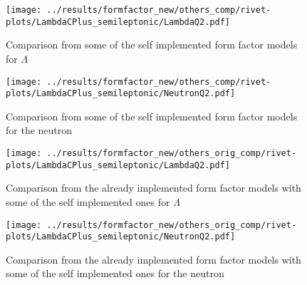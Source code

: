 \begin{figure}[h]
  \centering
  \texttt{[image: ../results/formfactor\_new/others\_comp/rivet-plots/LambdaCPlus\_semileptonic/LambdaQ2.pdf]}
  \caption{Comparison from some of the self implemented form factor models for \(\Lambda\)} \label{gr:others_comp}
\end{figure}

\begin{figure}[h]
  \centering
  \texttt{[image: ../results/formfactor\_new/others\_comp/rivet-plots/LambdaCPlus\_semileptonic/NeutronQ2.pdf]}
  \caption{Comparison from some of the self implemented form factor models for the neutron} \label{gr:others_comp_n}
\end{figure}

\begin{figure}[h]
  \centering
  \texttt{[image: ../results/formfactor\_new/others\_orig\_comp/rivet-plots/LambdaCPlus\_semileptonic/LambdaQ2.pdf]}
  \caption{Comparison from the already implemented form factor models with 
  some of the self implemented ones for \(\Lambda\)} \label{gr:others_orig_comp}
\end{figure}

\begin{figure}[h]
  \centering
  \texttt{[image: ../results/formfactor\_new/others\_orig\_comp/rivet-plots/LambdaCPlus\_semileptonic/NeutronQ2.pdf]}
  \caption{Comparison from the already implemented form factor models with 
  some of the self implemented ones for the neutron} \label{gr:others_orig_comp_n}
\end{figure}

